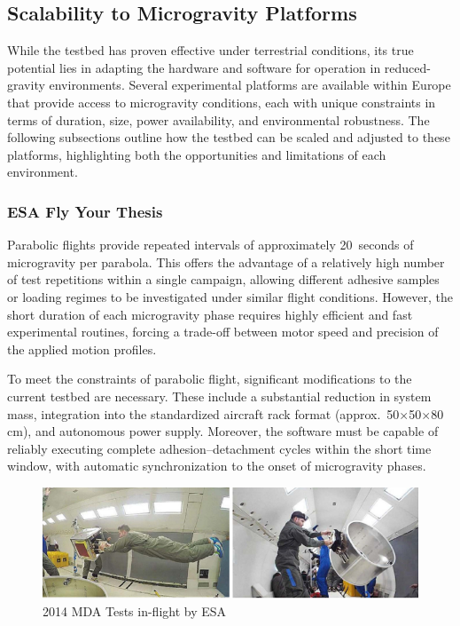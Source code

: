 \documentclass[
    twocolumn,
    fontsize = 10pt,
    parskip = half+,
    headings = small,
    headwidth = text,
    footwidth = text,
]{scrartcl}
\begin{document}
\subsection{Scalability to Microgravity Platforms}

While the testbed has proven effective under terrestrial conditions, 
its true potential lies in adapting the hardware and software for operation in reduced-gravity environments. 
Several experimental platforms are available within Europe that provide access to microgravity conditions, 
each with unique constraints in terms of duration, size, power availability, and environmental robustness. 
The following subsections outline how the testbed can be scaled and adjusted to these platforms, 
highlighting both the opportunities and limitations of each environment.

\subsubsection{ESA Fly Your Thesis}
Parabolic flights provide repeated intervals of approximately 20~seconds of microgravity per parabola. 
This offers the advantage of a relatively high number of test repetitions within a single campaign, 
allowing different adhesive samples or loading regimes to be investigated under similar flight conditions. 
However, the short duration of each microgravity phase requires highly efficient and fast experimental routines, 
forcing a trade-off between motor speed and precision of the applied motion profiles.

To meet the constraints of parabolic flight, significant modifications to the current testbed are necessary. 
These include a substantial reduction in system mass, integration into the standardized aircraft rack format 
(approx.\ 50$\times$50$\times$80\,cm), and autonomous power supply. 
Moreover, the software must be capable of reliably executing complete adhesion–detachment cycles within the short time window, 
with automatic synchronization to the onset of microgravity phases.

\begin{figure}[h!]
    \centering
    \includegraphics[width=0.7\linewidth]{pics/fly.png}
    \caption{2014 MDA Tests in-flight by ESA}
    \label{fig:fly}
\end{figure}
\end{document}
